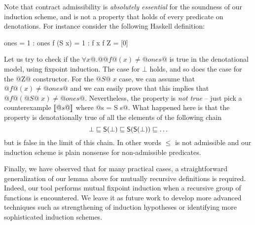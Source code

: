Note that contract admissibility is {\em absolutely essential} for the soundness of our induction scheme, 
and is not a property that holds of every predicate on denotations. For instance consider the following 
Haskell definition:
\begin{code}
ones = 1 : ones
f (S x) = 1 : f x
f Z     = [0]
\end{code}
Let us try to check if the $\forall x @.@ @f@(x) \neq @ones@$ is true in 
the denotational model, using fixpoint induction. The case for $\bot$ holds, 
and so does the case for the @Z@ constructor. For the $@S@\;x$ case, we can 
assume that $@f@(x) \neq @ones@$ and we can easily prove that this implies that
$@f@(@S@\;x) \neq @ones@$. Nevertheless, the property is {\em not true} -- just pick 
a counterexample $[\![@s@]\!]$ where @s = S s@. What happened here is that the property 
is denotationally true of all the elements of the following chain
\[ \bot \sqsubseteq \mathsf{S}(\bot) \sqsubseteq \mathsf{S}(\mathsf{S}(\bot)) \sqsubseteq \ldots \] 
but is false in the limit of this chain. In other words $\leq$ is not admissible and our 
induction scheme is plain nonsense for non-admissible predicates. 

Finally, we have observed that for many practical cases, a straightforward generalization of our lemma above for 
mutually recursive definitions is required. Indeed, our tool performs mutual fixpoint induction when a recursive
group of functions is encountered. We leave it as future work to develop more advanced techniques such as 
strengthening of induction hypotheses or identifying more sophisticated induction schemes. 


